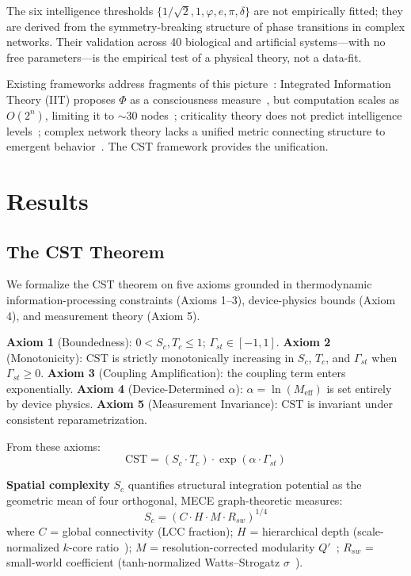 \documentclass[12pt]{article}
\newcommand{\CST}{\mathrm{CST}}
\newcommand{\Sc}{S_c}
\newcommand{\Tc}{T_c}
\newcommand{\Gst}{\Gamma_{st}}
\newcommand{\Meff}{M_{\mathrm{eff}}}
\begin{document}
The six intelligence thresholds $\{1/\sqrt{2}, 1, \varphi, e, \pi, \delta\}$ are not empirically fitted; they are derived from the symmetry-breaking structure of phase transitions in complex networks. Their validation across 40 biological and artificial systems---with no free parameters---is the empirical test of a physical theory, not a data-fit.

Existing frameworks address fragments of this picture~\cite{tononi2004book,sporns2010,bassett2017}: Integrated Information Theory (IIT) proposes $\Phi$ as a consciousness measure~\cite{tononi2016}, but computation scales as $O(2^n)$, limiting it to $\sim$30 nodes~\cite{barrett2019}; criticality theory does not predict intelligence levels~\cite{beggs2003,shew2009}; complex network theory lacks a unified metric connecting structure to emergent behavior~\cite{sporns2010,sporns2016}. The CST framework provides the unification.

\section{Results}

\subsection{The CST Theorem}

We formalize the CST theorem on five axioms grounded in thermodynamic information-processing constraints (Axioms 1--3), device-physics bounds (Axiom 4), and measurement theory (Axiom 5).

\textbf{Axiom 1} (Boundedness): $0 < \Sc, \Tc \leq 1$; $\Gst \in [-1, 1]$.
\textbf{Axiom 2} (Monotonicity): $\CST$ is strictly monotonically increasing in $\Sc$, $\Tc$, and $\Gst$ when $\Gst \geq 0$.
\textbf{Axiom 3} (Coupling Amplification): the coupling term enters exponentially.
\textbf{Axiom 4} (Device-Determined $\alpha$): $\alpha = \ln(\Meff)$ is set entirely by device physics.
\textbf{Axiom 5} (Measurement Invariance): $\CST$ is invariant under consistent reparametrization.

From these axioms:
\begin{equation}
\CST = (\Sc \cdot \Tc) \cdot \exp(\alpha \cdot \Gst) \tag{1}
\end{equation}

\textbf{Spatial complexity} $\Sc$ quantifies structural integration potential as the geometric mean of four orthogonal, MECE graph-theoretic measures:
\begin{equation}
\Sc = (C \cdot H \cdot M \cdot R_{sw})^{1/4} \tag{2}
\end{equation}
where $C$ = global connectivity (LCC fraction); $H$ = hierarchical depth (scale-normalized $k$-core ratio~\cite{seidman1983}); $M$ = resolution-corrected modularity $Q'$~\cite{fortunato2007}; $R_{sw}$ = small-world coefficient (tanh-normalized Watts--Strogatz $\sigma$~\cite{watts1998}).
\end{document}
